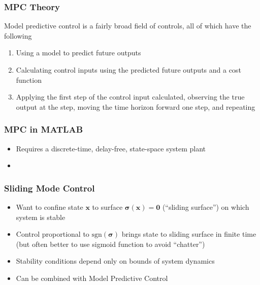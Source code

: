 \documentclass[aspectratio=169]{beamer}
\begin{document}
\begin{frame}[t]
    \frametitle{MPC Theory}
    Model predictive control is a fairly broad field of controls, all of which have the following
    \begin{enumerate}
        \item Using a model to predict future outputs
        \item Calculating control inputs using the predicted future outputs and a cost function
        \item Applying the first step of the control input calculated, observing the true output at
            the step, moving the time horizon forward one step, and repeating
    \end{enumerate}
    
\end{frame}

\begin{frame}[t]
    \frametitle{MPC in MATLAB}
    \begin{itemize}
        \item Requires a discrete-time, delay-free, state-space system plant
        \item 
    \end{itemize}
\end{frame}

\begin{frame}[t]
    \frametitle{Sliding Mode Control}
    \begin{itemize}
        \item Want to confine state $\mathbf{x}$ to surface $\boldsymbol{\sigma}(\mathbf{x})=\mathbf{0}$ (``sliding surface'') on which system is stable
        \item Control proportional to $\mathrm{sgn}(\boldsymbol{\sigma})$ brings state to sliding surface in finite time (but often better to use sigmoid function to avoid ``chatter'')
        \item Stability conditions depend only on bounds of system dynamics
        \item Can be combined with Model Predictive Control
    \end{itemize}
\end{frame}
\end{document}
